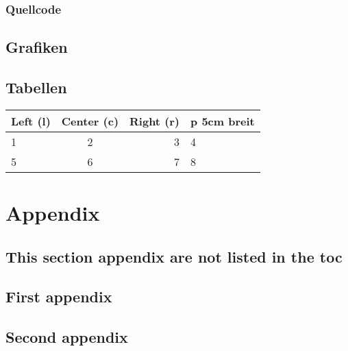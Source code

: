 \documentclass[
	12pt %
	,a4paper %
	,headings=normal %
	,toc=graduated %
]{scrreprt} %
\begin{document}
\subsection{Quellcode}\label{quellcode}


\section{Grafiken}\label{sec:grafiken}


\section{Tabellen}\label{sec:tabellen}

\begin{table}[ht]
	\centering
	\label{tab:matrix}
	\begin{tabular}{ | l | c | r | p{5cm} | }
		\hline
		\textbf{Left (l)} & \textbf{Center (c)} & \textbf{Right (r)} & \textbf{p 5cm breit}\\
		\hline
		1 & 2 & 3 & 4\\
		\hline
		5 & 6 & 7 & 8\\
		\hline
	\end{tabular}
\end{table}


\appendix
\chapter{Appendix}\label{cha:appendix}
\setcounter{page}{1}

\section*{This section appendix are not listed in the toc}\label{sec:appendixNotInToc}
\section{First appendix}\label{sec:firstAppendix}

\newpage

\section{Second appendix}\label{sec:secondAppendix}
\end{document}

